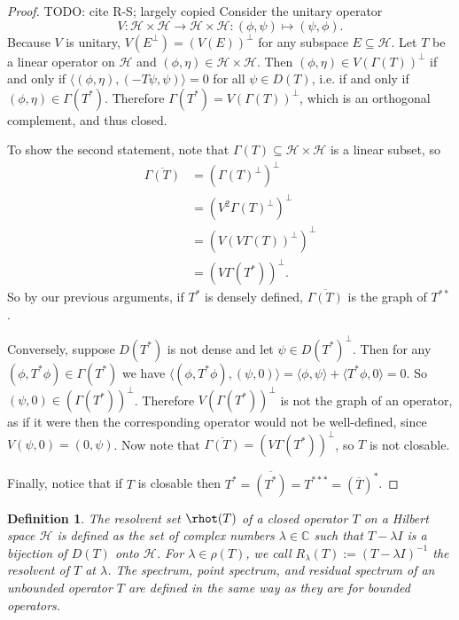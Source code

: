 \documentclass[12pt,oneside]{report}
\newtheorem{defn}[thm]{Definition}
\begin{document}
\begin{proof}
    TODO: cite R-S; largely copied Consider the unitary operator $$V: \mathscr{H} \times \mathscr{H} \to \mathscr{H} \times \mathscr{H}: (\phi,\psi) \mapsto (\psi,\phi).$$Because $V$ is unitary, $V(E^{\perp}) = (V(E))^{\perp}$ for any subspace $E \subseteq \mathscr{H}$. Let $T$ be a linear operator on $\mathscr{H}$ and $(\phi, \eta) \in \mathscr{H} \times \mathscr{H}$. Then $(\phi, \eta) \in V(\Gamma(T))^{\perp}$ if and only if $\langle (\phi,\eta), (-T\psi,\psi) \rangle = 0$ for all $\psi \in D(T)$, i.e. if and only if $(\phi, \eta) \in \Gamma(T^{*})$. Therefore $\Gamma(T^{*}) = V(\Gamma(T))^{\perp}$, which is an orthogonal complement, and thus closed.

    To show the second statement, note that $\Gamma(T) \subseteq \mathscr{H} \times \mathscr{H}$ is a linear subset, so
    \begin{align}
        \overline{\Gamma(T)} &= (\Gamma(T)^{\perp})^{\perp} \\
        &= (V^{2}\Gamma(T)^{\perp})^{\perp} \\
        &= (V(V\Gamma(T))^{\perp})^{\perp} \\
        &= (V\Gamma(T^{*}))^{\perp}.
    \end{align}
    So by our previous arguments, if $T^{*}$ is densely defined, $\overline{\Gamma(T)}$ is the graph of $T^{**}$.

    Conversely, suppose $D(T^{*})$ is not dense and let $\psi \in D(T^{*})^{\perp}$. 
    Then for any $(\phi, T^{*}\phi) \in \Gamma(T^{*})$ we have $\langle (\phi, T^{*}\phi), (\psi,0) \rangle = \langle \phi, \psi \rangle + \langle T^{*}\phi, 0 \rangle = 0$. So $(\psi, 0) \in (\Gamma(T^{*}))^{\perp}$.
    Therefore $V(\Gamma(T^{*}))^{\perp}$ is not the graph of an operator, as if it were then the corresponding operator would not be well-defined, since $V(\psi, 0) = (0, \psi)$. Now note that $\overline{\Gamma(T)} = (V\Gamma(T^{*}))^{\perp}$, so $T$ is not closable.

    Finally, notice that if $T$ is closable then $T^{*} = \overline{(T^{*})} = T^{***} = (\overline{T})^{*}$.
\end{proof}

\begin{defn}
    The resolvent set $\rhot(T)$ of a closed operator $T$ on a Hilbert space $\mathscr{H}$ is defined as the set of complex numbers $\lambda \in \mathbb{C}$ such that $T - \lambda I$ is a bijection of $D(T)$ onto $\mathscr{H}$. For $\lambda \in \rho(T)$, we call $R_\lambda (T) := (T - \lambda I)^{-1}$ the resolvent of $T$ at $\lambda$. The spectrum, point spectrum, and residual spectrum of an unbounded operator $T$ are defined in the same way as they are for bounded operators.
\end{defn}
\end{document}
